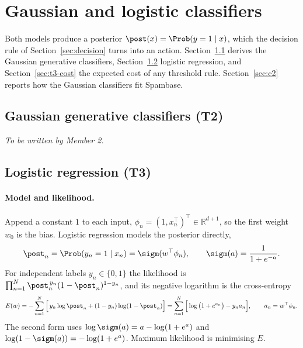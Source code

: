 \section{Gaussian and logistic classifiers}
\label{sec:models}

Both models produce a posterior $\post(x)=\Prob(y=1\mid x)$, which the decision rule of
Section~\ref{sec:decision} turns into an action. Section~\ref{sec:t2} derives the Gaussian
generative classifiers, Section~\ref{sec:t3-logreg} logistic regression, and
Section~\ref{sec:t3-cost} the expected cost of any threshold rule. Section~\ref{sec:c2} reports how
the Gaussian classifiers fit Spambase.

\subsection{Gaussian generative classifiers (T2)}
\label{sec:t2}
\emph{To be written by Member 2.}

\subsection{Logistic regression (T3)}
\label{sec:t3-logreg}

\paragraph{Model and likelihood.}
Append a constant $1$ to each input, $\phi_n=(1,x_n^\top)^\top\in\mathbb R^{d+1}$, so the first weight
$w_0$ is the bias. Logistic regression models the posterior directly,
\[
  \post_n = \Prob(y_n=1\mid x_n) = \sigm(w^\top\phi_n), \qquad \sigm(a)=\frac{1}{1+e^{-a}} .
\]
For independent labels $y_n\in\{0,1\}$ the likelihood is
$\prod_{n=1}^N \post_n^{\,y_n}(1-\post_n)^{1-y_n}$, and its negative logarithm is the
cross-entropy
\begin{equation}
  E(w) = -\sum_{n=1}^N \Big[\,y_n\log \post_n + (1-y_n)\log(1-\post_n)\Big]
       = \sum_{n=1}^N \Big[\log\big(1+e^{a_n}\big) - y_n a_n\Big], \qquad a_n=w^\top\phi_n .
  \label{eq:t3-ce}
\end{equation}
The second form uses $\log\sigm(a)=a-\log(1+e^{a})$ and $\log(1-\sigm(a))=-\log(1+e^{a})$.
Maximum likelihood is minimising $E$.

